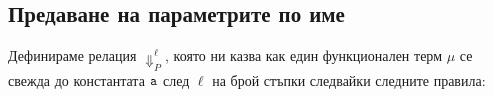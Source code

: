 \subsection{Предаване на параметрите по име}




Дефинираме релация $\Downarrow^\ell_P$, която ни казва как един функционален терм $\mu$
се свежда до константата $\texttt{a}$ след $\ell$ на брой стъпки следвайки следните правила:

